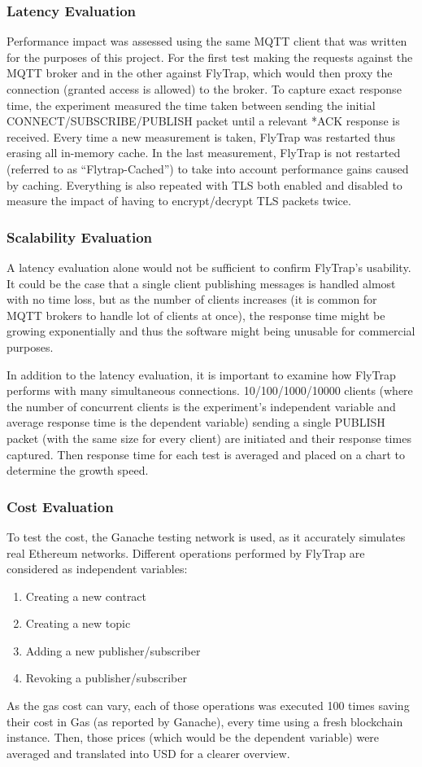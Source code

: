 \subsubsection{Latency Evaluation} Performance impact was assessed using the same MQTT client that was written for the purposes of this project. For the first test making the requests against the MQTT broker and in the other against FlyTrap, which would then proxy the connection (granted access is allowed) to the broker. To capture exact response time, the experiment measured the time taken between sending the initial CONNECT/SUBSCRIBE/PUBLISH packet until a relevant *ACK response is received. Every time a new measurement is taken, FlyTrap was restarted thus erasing all in-memory cache. In the last measurement, FlyTrap is not restarted (referred to as ``Flytrap-Cached'') to take into account performance gains caused by caching. Everything is also repeated with TLS both enabled and disabled to measure the impact of having to encrypt/decrypt TLS packets twice.
\subsubsection{Scalability Evaluation}
A latency evaluation alone would not be sufficient to confirm FlyTrap's usability. It could be the case that a single client publishing messages is handled almost with no time loss, but as the number of clients increases (it is common for MQTT brokers to handle lot of clients at once), the response time might be growing exponentially and thus the software might being unusable for commercial purposes. 

In addition to the latency evaluation, it is important to examine how FlyTrap performs with many simultaneous connections. 10/100/1000/10000 clients (where the number of concurrent clients is the experiment's independent variable and average response time is the dependent variable) sending a single PUBLISH packet (with the same size for every client) are initiated and their response times captured. Then response time for each test is averaged and placed on a chart to determine the growth speed.  
\subsubsection{Cost Evaluation}
To test the cost, the Ganache testing network is used, as it accurately simulates real Ethereum networks. Different operations performed by FlyTrap are considered as independent variables:
\begin{enumerate}
  \item Creating a new contract
  \item Creating a new topic
  \item Adding a new publisher/subscriber
  \item Revoking a publisher/subscriber
\end{enumerate}
As the gas cost can vary, each of those operations was executed 100 times saving their cost in Gas (as reported by Ganache), every time using a fresh blockchain instance. Then, those prices (which would be the dependent variable) were averaged and translated into USD for a clearer overview.

